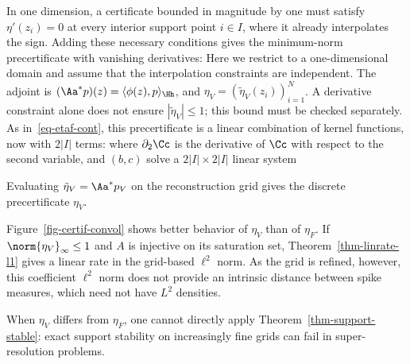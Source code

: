 In one dimension, a certificate bounded in magnitude by one must satisfy $\eta'(z_i)=0$ at every interior support point $i \in I$, where it already interpolates the sign. Adding these necessary conditions gives the minimum-norm precertificate with vanishing derivatives:
Here we restrict to a one-dimensional domain and assume that the interpolation constraints are independent. The adjoint is $(\Aa^*p)(z)=\langle\phi(z),p\rangle_\Hh$, and $\eta_V=(\tilde\eta_V(z_i))_{i=1}^N$. A derivative constraint alone does not ensure $|\tilde\eta_V|\leq1$; this bound must be checked separately.
As in~\eqref{eq-etaf-cont}, this precertificate is a linear combination of kernel functions, now with $2|I|$ terms:
where $\partial_2\Cc$ is the derivative of $\Cc$ with respect to the second variable, and $(b,c)$ solve a $2|I| \times 2|I|$ linear system
 
Evaluating $\tilde\eta_V=\Aa^*p_V$ on the reconstruction grid gives the discrete precertificate $\eta_V$.
 
Figure~\ref{fig-certif-convol} shows better behavior of $\eta_V$ than of $\eta_F$. If $\norm{\eta_V}_\infty\leq1$ and $A$ is injective on its saturation set, Theorem~\ref{thm-linrate-l1} gives a linear rate in the grid-based $\ell^2$ norm. As the grid is refined, however, this coefficient $\ell^2$ norm does not provide an intrinsic distance between spike measures, which need not have $L^2$ densities.
 
When $\eta_V$ differs from $\eta_F$, one cannot directly apply Theorem~\ref{thm-support-stable}: exact support stability on increasingly fine grids can fail in super-resolution problems.
 
